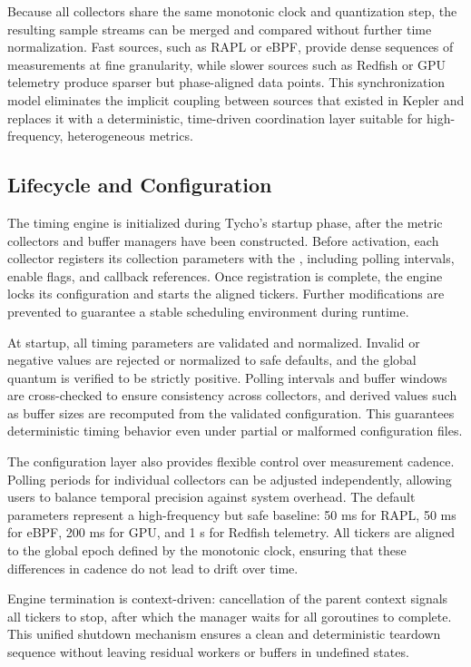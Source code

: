 Because all collectors share the same monotonic clock and quantization step, the resulting sample streams can be merged and compared without further time normalization.  
Fast sources, such as RAPL or eBPF, provide dense sequences of measurements at fine granularity, while slower sources such as Redfish or GPU telemetry produce sparser but phase-aligned data points.  
This synchronization model eliminates the implicit coupling between sources that existed in Kepler and replaces it with a deterministic, time-driven coordination layer suitable for high-frequency, heterogeneous metrics.

\subsection{Lifecycle and Configuration}
\label{subsec:tycho_timing_lifecycle}

The timing engine is initialized during Tycho’s startup phase, after the metric collectors and buffer managers have been constructed.  
Before activation, each collector registers its collection parameters with the , including polling intervals, enable flags, and callback references.  
Once registration is complete, the engine locks its configuration and starts the aligned tickers.  
Further modifications are prevented to guarantee a stable scheduling environment during runtime.

At startup, all timing parameters are validated and normalized.  
Invalid or negative values are rejected or normalized to safe defaults, and the global quantum is verified to be strictly positive.  
Polling intervals and buffer windows are cross-checked to ensure consistency across collectors, and derived values such as buffer sizes are recomputed from the validated configuration.  
This guarantees deterministic timing behavior even under partial or malformed configuration files.

The configuration layer also provides flexible control over measurement cadence.  
Polling periods for individual collectors can be adjusted independently, allowing users to balance temporal precision against system overhead.  
The default parameters represent a high-frequency but safe baseline: 50 ms for RAPL, 50 ms for eBPF, 200 ms for GPU, and 1 s for Redfish telemetry.  
All tickers are aligned to the global epoch defined by the monotonic clock, ensuring that these differences in cadence do not lead to drift over time.

Engine termination is context-driven: cancellation of the parent context signals all tickers to stop, after which the manager waits for all goroutines to complete.  
This unified shutdown mechanism ensures a clean and deterministic teardown sequence without leaving residual workers or buffers in undefined states.

